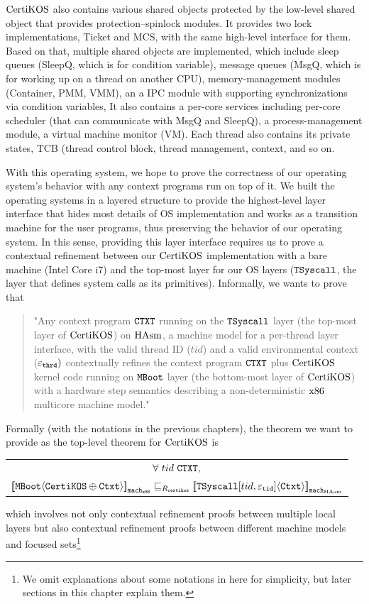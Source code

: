 $\mathrm{CertiKOS}$ also contains various shared objects protected by 
the low-level shared object that provides protection--spinlock modules.
It provides two lock implementations, Ticket and MCS, with the same high-level interface for them. 
Based on that, 
multiple shared objects are implemented, which include
sleep queues (SleepQ, which is for condition variable), message queues (MsgQ, which is for working up on a thread on another CPU), memory-management modules (Container, PMM, VMM), an a IPC module with supporting synchronizations via condition variables, \etc
It also contains a per-core services including per-core scheduler (that can communicate with MsgQ and SleepQ), a process-management module,
a virtual machine monitor (VM). 
Each thread also contains its private states, TCB (thread control block, thread management, context, and so on. 

With this operating system, 
we hope to prove  the correctness of our operating system's behavior with any context programs run on top of it.
We  built the operating systems in a layered structure to provide the highest-level layer interface that hides most details of OS implementation and
works as a transition machine for the user programs, thus preserving the behavior of our operating system.  
In this sense, providing this layer interface requires us 
to prove a contextual refinement between our $\mathrm{CertiKOS}$ implementation with a bare machine (Intel Core i7) and 
the top-most layer for our OS layers (${\mathrm{\texttt{TSyscall}}}$, the layer that defines system calls as its primitives).
Informally, we wants to prove that
\begin{quote}
"Any context program ${\mathrm{\texttt{CTXT}}}$ running on the ${\mathrm{\texttt{TSyscall}}}$ layer (the top-most layer of $\mathrm{CertiKOS}$) on $\mathrm{HAsm}$, a machine model for a per-thread layer interface, with the valid thread ID ($tid$)
and a valid environmental context (${\varepsilon}_{{\mathrm{\texttt{thrd}}}})$ 
contextually refines the context program ${\mathrm{\texttt{CTXT}}}$ plus $\mathrm{CertiKOS}$ kernel code running on ${\mathrm{\texttt{MBoot}}}$ layer (the bottom-most layer of $\mathrm{CertiKOS}$) with a hardware step semantics describing a non-deterministic $\mathrm{x86}$ multicore machine model."
\end{quote}
Formally (with the notations in the previous chapters), the theorem we want to provide as the top-level theorem for $\mathrm{CertiKOS}$ is 
 \begin{center}
\begin{tabular}{c}
$\forall\ tid\  \codeinmath{CTXT},$\\
${[\![{{\mathrm{\texttt{MBoot}}}} \langle {{\mathrm{\texttt{CertiKOS}}} \oplus {\mathrm{\texttt{Ctxt}}}} \rangle]\!]}_{{\mathrm{\texttt{mach}}}_{{\mathrm{\texttt{x86}}}}} \sqsubseteq_{R_{{\mathrm{\texttt{certikos}}}}} {[\![{{\mathrm{\texttt{TSyscall}}}[tid, {\varepsilon}_{{\mathrm{\texttt{tid}}}}]} \langle {{\mathrm{\texttt{Ctxt}}}} \rangle]\!]}_{{{\mathrm{\texttt{mach}}}_{\mathrm{HAsm}}}}$\\
\end{tabular}
\end{center}
which involves not only contextual refinement proofs between multiple local layers but also contextual refinement proofs between
different machine models and focused sets\footnote{We omit explanations about some notations in here for simplicity, but later sections in this chapter explain them.}

